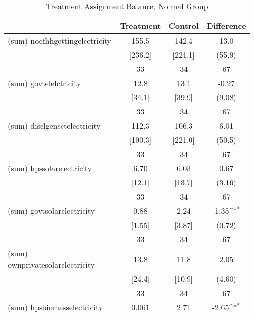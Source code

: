 \begin{table}[htbp]\centering
\def\sym#1{\ifmmode^{#1}\else\(^{#1}\)\fi}
\caption{Treatment Assignment Balance, Normal Group \label{tab:"balance"}}
\begin{tabular*}{0.9\hsize}{@{\hskip\tabcolsep\extracolsep\fill}l*{1}{ccc}}
\toprule
                                &Treatment&  Control&Difference         \\
\midrule
(sum) noofhhgettingelectricity  &    155.5&    142.4&     13.0         \\
                                &  [236.2]&  [221.1]&   (55.9)         \\
                                &       33&       34&       67         \\
(sum) govtelelctricity          &     12.8&     13.1&    -0.27         \\
                                &   [34.1]&   [39.9]&   (9.08)         \\
                                &       33&       34&       67         \\
(sum) diselgensetelectricity    &    112.3&    106.3&     6.01         \\
                                &  [190.3]&  [221.0]&   (50.5)         \\
                                &       33&       34&       67         \\
(sum) hpssolarelectricity       &     6.70&     6.03&     0.67         \\
                                &   [12.1]&   [13.7]&   (3.16)         \\
                                &       33&       34&       67         \\
(sum) govtsolarelectricity      &     0.88&     2.24&    -1.35\sym{*}  \\
                                &   [1.55]&   [3.87]&   (0.72)         \\
                                &       33&       34&       67         \\
(sum) ownprivatesolarelectricity&     13.8&     11.8&     2.05         \\
                                &   [24.4]&   [10.9]&   (4.60)         \\
                                &       33&       34&       67         \\
(sum) hpsbiomasselectricity     &    0.061&     2.71&    -2.65\sym{*}  \\

\end{tabular*}
\end{table}
